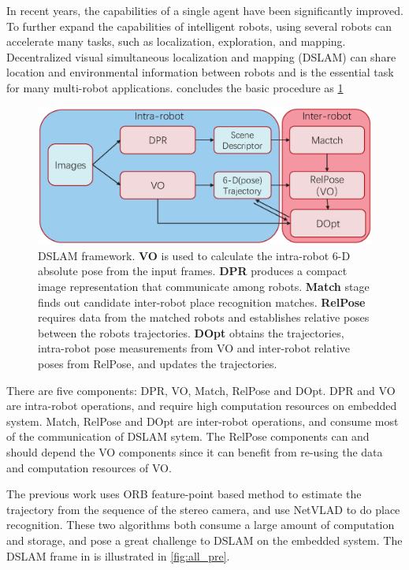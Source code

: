 \label{sec:introdutction}
In recent years, the capabilities of a single agent have been significantly improved. To further expand the capabilities of intelligent robots, using several robots can accelerate many tasks, such as localization, exploration, and mapping.
Decentralized visual simultaneous localization and
mapping (DSLAM) can share location and environmental information between robots and is the essential task for many multi-robot applications. \cite{Cieslewski:20187ee} concludes the basic procedure as \cref{fig:all}

\begin{figure}[h]  
    \centering  
    \includegraphics[width=0.75\linewidth]{fig/all.eps}
    \caption{DSLAM framework\cite{Cieslewski:20187ee}. \textbf{VO} is used to calculate the intra-robot 6-D absolute pose from the input frames. \textbf{DPR} produces a compact image representation that communicate among robots. \textbf{Match} stage finds out candidate inter-robot place recognition matches.  \textbf{RelPose} requires data from the matched robots and establishes relative poses between the robots trajectories. \textbf{DOpt} obtains the trajectories, intra-robot pose measurements from VO and inter-robot relative poses from RelPose, and updates the trajectories.}
    \label{fig:all}
\end{figure}

There are five components: DPR, VO, Match, RelPose and DOpt. DPR and VO are intra-robot operations, and require high computation resources on embedded system. Match, RelPose and DOpt are inter-robot operations, and consume most of the communication of DSLAM sytem. The RelPose components can and should depend the VO components since it can benefit from re-using the data and computation resources of VO.

The previous work \cite{Cieslewski:20187ee} uses ORB feature-point based method to estimate the trajectory from the sequence of the stereo camera, and use NetVLAD \cite{Arandjelovic:2017997} to do place recognition. These two algorithms both consume a large amount of computation and storage, and pose a great challenge to DSLAM on the embedded system. The DSLAM frame in \cite{Cieslewski:20187ee} is illustrated in \cref{fig:all_pre}.


